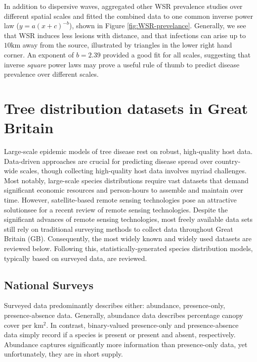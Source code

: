 In addition to dispersive waves, \cite{severns2019consequences} aggregated other WSR prevalence studies over different spatial 
scales and fitted the combined data to one common inverse power law ($y=a(x+c)^{-b}$), shown in Figure \ref{fig:WSR-prevelance}.
Generally, we see that WSR induces less lesions with distance, and that infections can arise up to $10\mathrm{km}$ away from the source,
illustrated by triangles in the lower right hand corner.
An exponent of $b=2.39$ provided a good fit for all scales, suggesting that inverse \textit{square} power laws may 
prove a useful rule of thumb to predict disease prevalence over different scales.

\section{Tree distribution datasets in Great Britain}
\label{ch2:hostdata}

Large-scale epidemic models of tree disease rest on robust, high-quality host data.
Data-driven approaches are crucial for predicting disease spread over country-wide scales, 
though collecting high-quality host data involves myriad challenges. 
Most notably, large-scale species distributions require vast datasets that demand significant economic resources
and person-hours to assemble and maintain over time. 
However, satellite-based remote sensing technologies pose an attractive solution\textemdash see \cite{camarretta2020monitoring} for a recent review of remote sensing technologies.
Despite the significant advances of remote sensing technologies, most freely available data sets still rely on traditional surveying methods to collect data throughout Great Britain (GB).
Consequently, the most widely known and widely used datasets are reviewed below.
Following this, statistically-generated species distribution models, typically based on surveyed data, are reviewed.

\subsection{National Surveys}
\label{sec:nationa-surveyes}

Surveyed data predominantly describes either: abundance, presence-only, presence-absence data. 
Generally, abundance data describes percentage canopy cover per $\mathrm{km^2}$.
In contrast, binary-valued presence-only and presence-absence data simply record if a species is present or present and absent, respectively.
Abundance captures significantly more information than presence-only data, yet unfortunately, they are in short supply.

